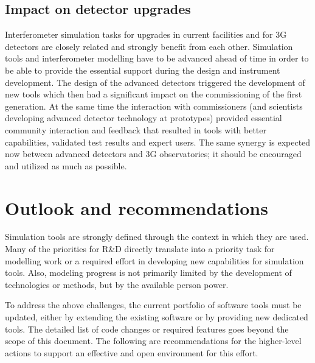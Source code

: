 \subsection{Impact on detector upgrades}
Interferometer simulation tasks for upgrades in current facilities and for 3G detectors are closely related and strongly benefit from each other. Simulation tools and interferometer modelling have to be advanced ahead of time in order to be able to provide the essential
support during the design and instrument development. The design of the advanced detectors triggered the development of new tools which then had a significant impact on the commissioning of the first generation. At the same time the interaction with commissioners (and scientists developing advanced detector
technology at prototypes) provided essential community interaction and feedback that resulted in tools with better capabilities, validated test results and expert users. The same synergy is expected now between advanced detectors and 3G observatories; it should be encouraged and utilized as much as possible.

\section{Outlook and recommendations}
Simulation tools are strongly defined through the context in which they are used. Many of the priorities for R\&D directly translate into a priority task for modelling work or a required effort in developing new capabilities for simulation tools. Also, modeling progress is not primarily limited by the development of technologies or methods, but by the available person power.

To address the above challenges, the current portfolio of software tools must be updated, either by extending the existing software or by providing new dedicated tools. The detailed list of code changes or required features goes beyond the scope of this document. The following are recommendations for the higher-level actions to support an effective and open environment for this effort.

